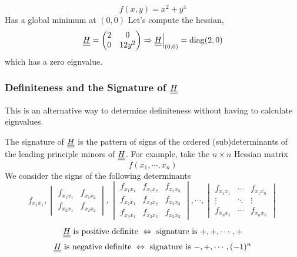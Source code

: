 \documentclass{article}
\begin{document}
\begin{eg}
    \[
        f(x, y) = x^2 + y^4  
    \]
    Has a global minimum at $(0, 0)$ Let's compute the hessian,
    \[
        \underline{\underline{H}} = \begin{pmatrix}
            2 & 0 \\
            0 & 12 y^2
        \end{pmatrix} \Rightarrow \underline{\underline{H}} \Big{|}_{(0, 0)}{} = \operatorname{diag}(2, 0)
    \]
    which has a zero eignvalue.
\end{eg}

\subsubsection*{Definiteness and the Signature of $\underline{\underline{H}}$}
This is an alternative way to determine definiteness without having to calculate eignvalues.

\begin{defi}[Signature]
    The signature of $\underline{\underline{H}}$ is the pattern of signs of the ordered (sub)determinants of the leading principle minors of $\underline{\underline{H}}$.
    For example, take the $n \times n$ Hessian matrix
    \[
        f(x_1, \cdots, x_n)  
    \]
    We consider the signs of the following determinants
    \[
        f_{x_1x_1}, \begin{vmatrix}
            f_{x_1x_1} & f_{x_1x_2} \\
            f_{x_2x_1} & f_{x_2x_2}
        \end{vmatrix}, \begin{vmatrix}
            f_{x_1x_1} & f_{x_1x_2} & f_{x_1x_3} \\
            f_{x_2x_1} & f_{x_2x_2} & f_{x_2x_3} \\
            f_{x_3x_1} & f_{x_3x_2} & f_{x_3x_3}
        \end{vmatrix}, 
        \cdots,
        \begin{vmatrix}
            f_{x_1x_1} & \cdots & f_{x_1x_n} \\
            \vdots & \ddots & \vdots \\
            f_{x_nx_1} & \cdots & f_{x_nx_n}
        \end{vmatrix}
    \]
\end{defi}

\begin{defi}
\[
    \underline{\underline{H}} \text{ is positive definite } \Leftrightarrow \text{ signature is } +, +, \cdots, +
\]
\[
    \underline{\underline{H}} \text{ is negative definite } \Leftrightarrow \text{ signature is } -, +, \cdots, (-1)^n
\]
\end{defi}
\end{document}
